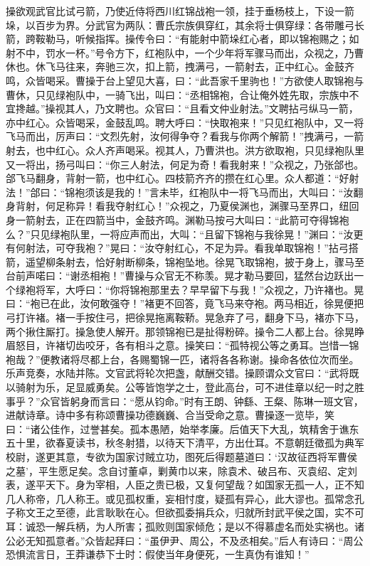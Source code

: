 操欲观武官比试弓箭，乃使近侍将西川红锦战袍一领，挂于垂杨枝上，下设一箭垛，以百步为界。分武官为两队：曹氏宗族俱穿红，其余将士俱穿绿：各带雕弓长箭，跨鞍勒马，听候指挥。操传令曰：“有能射中箭垛红心者，即以锦袍赐之；如射不中，罚水一杯。”号令方下，红袍队中，一个少年将军骤马而出，众视之，乃曹休也。休飞马往来，奔驰三次，扣上箭，拽满弓，一箭射去，正中红心。金鼓齐鸣，众皆喝采。曹操于台上望见大喜，曰：“此吾家千里驹也！”方欲使人取锦袍与曹休，只见绿袍队中，一骑飞出，叫曰：“丞相锦袍，合让俺外姓先取，宗族中不宜搀越。”操视其人，乃文聘也。众官曰：“且看文仲业射法。”文聘拈弓纵马一箭，亦中红心。众皆喝采，金鼓乱鸣。聘大呼曰：“快取袍来！”只见红袍队中，又一将飞马而出，厉声曰：“文烈先射，汝何得争夺？看我与你两个解箭！”拽满弓，一箭射去，也中红心。众人齐声喝采。视其人，乃曹洪也。洪方欲取袍，只见绿袍队里又一将出，扬弓叫曰：“你三人射法，何足为奇！看我射来！”众视之，乃张郃也。郃飞马翻身，背射一箭，也中红心。四枝箭齐齐的攒在红心里。众人都道：“好射法！”郃曰：“锦袍须该是我的！”言未毕，红袍队中一将飞马而出，大叫曰：“汝翻身背射，何足称异！看我夺射红心！”众视之，乃夏侯渊也，渊骤马至界口，纽回身一箭射去，正在四箭当中，金鼓齐鸣。渊勒马按弓大叫曰：“此箭可夺得锦袍么？”只见绿袍队里，一将应声而出，大叫：“且留下锦袍与我徐晃！”渊曰：“汝更有何射法，可夺我袍？”晃曰：“汝夺射红心，不足为异。看我单取锦袍！”拈弓搭箭，遥望柳条射去，恰好射断柳条，锦袍坠地。徐晃飞取锦袍，披于身上，骤马至台前声喏曰：“谢丞相袍！”曹操与众官无不称羡。晃才勒马要回，猛然台边跃出一个绿袍将军，大呼曰：“你将锦袍那里去？早早留下与我！”众视之，乃许褚也。晃曰：“袍已在此，汝何敢强夺！”褚更不回答，竟飞马来夺袍。两马相近，徐晃便把弓打许褚。褚一手按住弓，把徐晃拖离鞍鞒。晃急弃了弓，翻身下马，褚亦下马，两个揪住厮打。操急使人解开。那领锦袍已是扯得粉碎。操令二人都上台。徐晃睁眉怒目，许褚切齿咬牙，各有相斗之意。操笑曰：“孤特视公等之勇耳。岂惜一锦袍哉？”便教诸将尽都上台，各赐蜀锦一匹，诸将各各称谢。操命各依位次而坐。乐声竞奏，水陆并陈。文官武将轮次把盏，献酬交错。操顾谓众文官曰：“武将既以骑射为乐，足显威勇矣。公等皆饱学之士，登此高台，可不进佳章以纪一时之胜事乎？”众官皆躬身而言曰：“愿从钧命。”时有王朗、钟繇、王粲、陈琳一班文官，进献诗章。诗中多有称颂曹操功德巍巍、合当受命之意。曹操逐一览毕，笑曰：“诸公佳作，过誉甚矣。孤本愚陋，始举孝廉。后值天下大乱，筑精舍于谯东五十里，欲春夏读书，秋冬射猎，以待天下清平，方出仕耳。不意朝廷徵孤为典军校尉，遂更其意，专欲为国家讨贼立功，图死后得题墓道曰：‘汉故征西将军曹侯之墓’，平生愿足矣。念自讨董卓，剿黄巾以来，除袁术、破吕布、灭袁绍、定刘表，遂平天下。身为宰相，人臣之贵已极，又复何望哉？如国家无孤一人，正不知几人称帝，几人称王。或见孤权重，妄相忖度，疑孤有异心，此大谬也。孤常念孔子称文王之至德，此言耿耿在心。但欲孤委捐兵众，归就所封武平侯之国，实不可耳：诚恐一解兵柄，为人所害；孤败则国家倾危；是以不得慕虚名而处实祸也。诸公必无知孤意者。”众皆起拜曰：“虽伊尹、周公，不及丞相矣。”后人有诗曰：“周公恐惧流言日，王莽谦恭下士时：假使当年身便死，一生真伪有谁知！”

